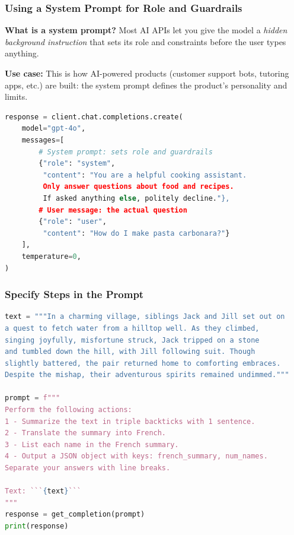 \begin{frame}[fragile]\frametitle{Using a System Prompt for Role and Guardrails}

\textbf{What is a system prompt?} Most AI APIs let you give the model a \emph{hidden background instruction} that sets its role and constraints before the user types anything.


\textbf{Use case:} This is how AI-powered products (customer support bots, tutoring apps, etc.) are built: the system prompt defines the product's personality and limits.


\begin{lstlisting}[language=Python]
response = client.chat.completions.create(
    model="gpt-4o",
    messages=[
        # System prompt: sets role and guardrails
        {"role": "system", 
         "content": "You are a helpful cooking assistant. 
         Only answer questions about food and recipes. 
         If asked anything else, politely decline."},
        # User message: the actual question
        {"role": "user", 
         "content": "How do I make pasta carbonara?"}
    ],
    temperature=0,
)
\end{lstlisting}



\end{frame}


\begin{frame}[fragile]\frametitle{Specify Steps in the Prompt}

{\tiny
\begin{lstlisting}[language=Python]
text = """In a charming village, siblings Jack and Jill set out on 
a quest to fetch water from a hilltop well. As they climbed, 
singing joyfully, misfortune struck, Jack tripped on a stone 
and tumbled down the hill, with Jill following suit. Though 
slightly battered, the pair returned home to comforting embraces. 
Despite the mishap, their adventurous spirits remained undimmed."""

prompt = f"""
Perform the following actions: 
1 - Summarize the text in triple backticks with 1 sentence.
2 - Translate the summary into French.
3 - List each name in the French summary.
4 - Output a JSON object with keys: french_summary, num_names.
Separate your answers with line breaks.

Text: ```{text}```
"""
response = get_completion(prompt)
print(response)
\end{lstlisting}
}	
		
\end{frame}

